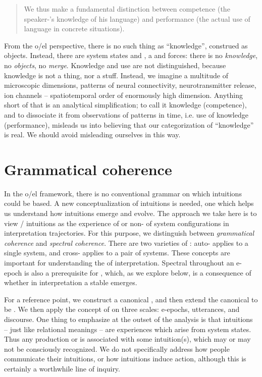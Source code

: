 \begin{quote}
We thus make a fundamental distinction between competence (the speaker-'s knowledge of his language) and performance (the actual use of language in concrete situations). \citep[4]{Chomsky1965}
\end{quote}


  From the o/el perspective, there is no such thing as “knowledge”, construed as objects. Instead, there are system states and , a  and forces: there is no \textit{knowledge}, no \textit{objects}, no \textit{merge}. Knowledge and use are not distinguished, because knowledge is not a thing, nor a stuff. Instead, we imagine a multitude of microscopic dimensions, patterns of neural connectivity, neurotransmitter release, ion channels -- spatiotemporal order of enormously high dimension. Anything short of that is an analytical simplification; to call it knowledge (competence), and to dissociate it from observations of patterns in time, i.e. use of knowledge (performance), misleads us into believing that our categorization of “knowledge” is real. We should avoid misleading ourselves in this way.

\section{Grammatical coherence}

In the o/el framework, there is no conventional grammar on which  intuitions could be based. A new conceptualization of intuitions is needed, one which helps us understand how intuitions emerge and evolve. The approach we take here is to view / intuitions as the experience of  or non- of system configurations in interpretation trajectories. For this purpose, we distinguish between \textit{grammatical coherence} and \textit{spectral coherence}. There are two varieties of : auto- applies to a single system, and cross- applies to a pair of systems. These concepts are important for understanding the  of interpretation. Spectral  throughout an e-epoch is also a prerequisite for , which, as we explore below, is a consequence of whether in interpretation a stable  emerges.

For a reference point, we construct a canonical , and then extend the canonical  to be . We then apply the concept of  on three scales: e-epochs, utterances, and discourse. One thing to emphasize at the outset of the analysis is that intuitions -- just like relational meanings -- are experiences which arise from system states. Thus any production or  is associated with some intuition(s), which may or may not be consciously recognized. We do not specifically address how people communicate their intuitions, or how intuitions induce action, although this is certainly a worthwhile line of inquiry.

